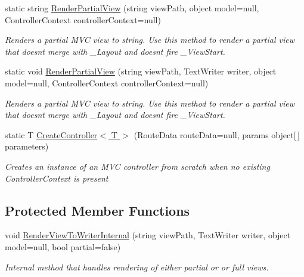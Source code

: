\begin{DoxyCompactItemize}
static string \hyperlink{class_open_1_1_g_i_1_1hypermart_1_1_helpers_1_1_view_renderer_a57700e4f845a9f94635e35f3c495317e}{Render\+Partial\+View} (string view\+Path, object model=null, Controller\+Context controller\+Context=null)
\begin{DoxyCompactList}\small\item\em Renders a partial M\+VC view to string. Use this method to render a partial view that doesn\textquotesingle{}t merge with \+\_\+\+Layout and doesn\textquotesingle{}t fire \+\_\+\+View\+Start. \end{DoxyCompactList}\item 
static void \hyperlink{class_open_1_1_g_i_1_1hypermart_1_1_helpers_1_1_view_renderer_a4be45c477d06f4c6505f7d8c65bc988a}{Render\+Partial\+View} (string view\+Path, Text\+Writer writer, object model=null, Controller\+Context controller\+Context=null)
\begin{DoxyCompactList}\small\item\em Renders a partial M\+VC view to string. Use this method to render a partial view that doesn\textquotesingle{}t merge with \+\_\+\+Layout and doesn\textquotesingle{}t fire \+\_\+\+View\+Start. \end{DoxyCompactList}\item 
static T \hyperlink{class_open_1_1_g_i_1_1hypermart_1_1_helpers_1_1_view_renderer_a886a3c16dcc5798c5c820b87810e8c0f}{Create\+Controller$<$ T $>$} (Route\+Data route\+Data=null, params object\mbox{[}$\,$\mbox{]} parameters)
\begin{DoxyCompactList}\small\item\em Creates an instance of an M\+VC controller from scratch when no existing Controller\+Context is present \end{DoxyCompactList}\end{DoxyCompactItemize}
\subsection*{Protected Member Functions}
\begin{DoxyCompactItemize}
\item 
void \hyperlink{class_open_1_1_g_i_1_1hypermart_1_1_helpers_1_1_view_renderer_a2dda3a83d880019292d23e2cef0c8ac9}{Render\+View\+To\+Writer\+Internal} (string view\+Path, Text\+Writer writer, object model=null, bool partial=false)
\begin{DoxyCompactList}\small\item\em Internal method that handles rendering of either partial or or full views. \end{DoxyCompactList}\end{DoxyCompactItemize}

